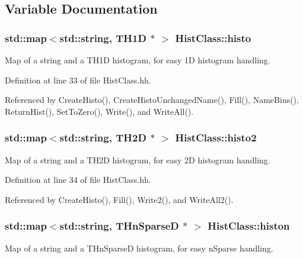\subsection{Variable Documentation}
\subsubsection[{histo}]{\setlength{\rightskip}{0pt plus 5cm}std\-::map$<$std\-::string, T\-H1\-D $\ast$ $>$ Hist\-Class\-::histo\hspace{0.3cm}{\ttfamily [static]}}\label{namespaceHistClass_aecbf6b504ef1fe080432da67ce20aa61}
Map of a string and a T\-H1\-D histogram, for easy 1\-D histogram handling. 

Definition at line 33 of file Hist\-Class.\-hh.



Referenced by Create\-Histo(), Create\-Histo\-Unchanged\-Name(), Fill(), Name\-Bins(), Return\-Hist(), Set\-To\-Zero(), Write(), and Write\-All().

\subsubsection[{histo2}]{\setlength{\rightskip}{0pt plus 5cm}std\-::map$<$std\-::string, T\-H2\-D $\ast$ $>$ Hist\-Class\-::histo2\hspace{0.3cm}{\ttfamily [static]}}\label{namespaceHistClass_afe55352b20fad49b9f1127977f69f0be}
Map of a string and a T\-H2\-D histogram, for easy 2\-D histogram handling. 

Definition at line 34 of file Hist\-Class.\-hh.



Referenced by Create\-Histo(), Fill(), Write2(), and Write\-All2().

\subsubsection[{histon}]{\setlength{\rightskip}{0pt plus 5cm}std\-::map$<$std\-::string, T\-Hn\-Sparse\-D $\ast$ $>$ Hist\-Class\-::histon\hspace{0.3cm}{\ttfamily [static]}}\label{namespaceHistClass_a32bc8c292c5e253ad53774e1e667d9e4}
Map of a string and a T\-Hn\-Sparse\-D histogram, for easy n\-Sparse handling. 

